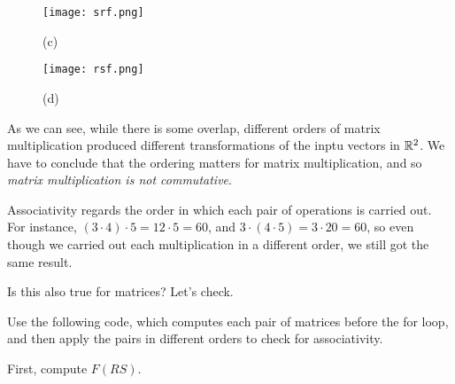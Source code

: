 \documentclass{ximera}
\begin{document}
\begin{exploration}
\begin{example}
\begin{selectAll}
        \end{selectAll}

        \begin{figure}[ht!]
            \centering
            \texttt{[image: srf.png]}
            \caption{(c)}
        \end{figure}

        \begin{selectAll}


        \end{selectAll}

        \begin{figure}[ht!]
            \centering
            \texttt{[image: rsf.png]}
            \caption{(d)}
        \end{figure}

        \begin{selectAll}


        \end{selectAll}

    As we can see, while there is some overlap, different orders of matrix multiplication produced different transformations of the inptu vectors in $\mathbb{R}^2$. We have to conclude that the ordering matters for matrix multiplication, and so \emph{matrix multiplication is not commutative}.

    \end{example}

    \begin{example}

        Associativity regards the order in which each pair of operations is carried out. For instance, $(3\cdot 4)\cdot 5=12\cdot 5=60$, and $3\cdot (4\cdot 5)=3\cdot 20=60$, so even though we carried out each multiplication in a different order, we still got the same result.

        Is this also true for matrices? Let's check.

        Use the following code, which computes each pair of matrices before the for loop, and then apply the pairs in different orders to check for associativity.

        First, compute $F(RS)$.


\end{example}
\end{exploration}
\end{document}
